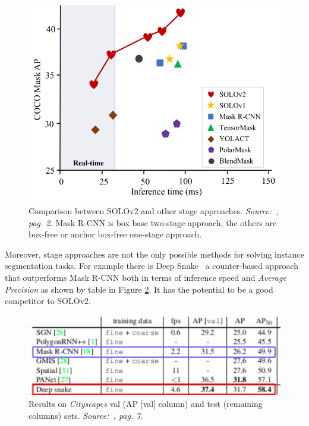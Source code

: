 \documentclass[10pt,twocolumn,letterpaper]{article}
\begin{document}
\begin{figure}[H]
\centering
  \includegraphics[width=0.7\linewidth]{./image/conclusion_SOLOv2.png}
  \caption{Comparison between SOLOv2 and other stage approaches. \textit{Source:~\cite{Authors6_SOLOv2}, pag. 2.} Mask R-CNN is box base two-stage approach, the others are box-free or anchor box-free one-stage approach.} %
  \label{fig:conclusionSOLOv2}
\noindent
\end{figure}
Moreover, stage approaches are not the only possible methods for solving instance segmentation tasks.
For example there is Deep Snake~\cite{Authors7_deepsnake} a counter-based approach that outperforms Mask R-CNN both in terms of inference speed and \textit{Average Precision} as shown by table in Figure \ref{fig:conclusiondeepsnake}. It has the potential to be a good competitor to SOLOv2.
\begin{figure}[H]
\centering
  \includegraphics[width=1\linewidth]{./image/conclusion_deepsnake.png}
  \caption{Results on \textit{Cityscapes} val (AP [val] column) and test (remaining columns) sets. \textit{Source:~\cite{Authors7_deepsnake}, pag. 7.}}
  \label{fig:conclusiondeepsnake}
\noindent
\end{figure}
\end{document}
